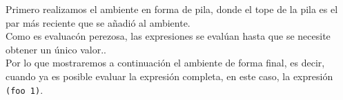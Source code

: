 \documentclass[11pt]{article}
\begin{document}
\begin{enumerate}[leftmargin=0.8cm]
\begin{itemize}
        Primero realizamos el ambiente en forma de pila, donde el tope de la pila es el par más reciente que se añadió al ambiente.\\
        Como es evaluacón perezosa, las expresiones se evalúan hasta que se necesite obtener un único valor..\\
        Por lo que mostraremos a continuación el ambiente de forma final, es decir, cuando ya es posible evaluar la expresión completa, en este caso, la expresión \texttt{(foo 1)}.\\


        \begin{center}

\end{center}
\end{itemize}
\end{enumerate}
\end{document}

